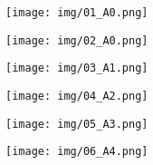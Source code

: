 
\begin{sidewaysfigure}[ht]
	\texttt{[image: img/01\_A0.png]}
\end{sidewaysfigure}

\newpage
\begin{sidewaysfigure}[ht]
	\texttt{[image: img/02\_A0.png]}
\end{sidewaysfigure}

\newpage
\begin{sidewaysfigure}[ht]
	\texttt{[image: img/03\_A1.png]}
\end{sidewaysfigure}

\newpage
\begin{sidewaysfigure}[ht]
	\texttt{[image: img/04\_A2.png]}
\end{sidewaysfigure}

\newpage
\begin{sidewaysfigure}[ht]
	\texttt{[image: img/05\_A3.png]}
\end{sidewaysfigure}

\newpage
\begin{sidewaysfigure}[ht]
	\texttt{[image: img/06\_A4.png]}
\end{sidewaysfigure}